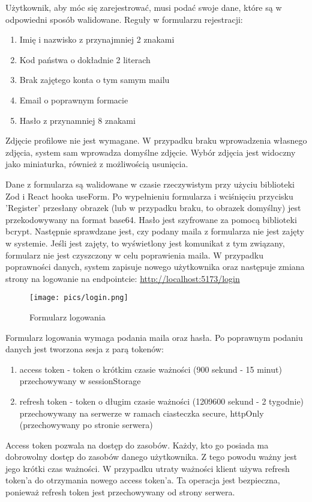 \documentclass{article}
\begin{document}
Użytkownik, aby móc się zarejestrować, musi podać swoje dane, które są w odpowiedni sposób walidowane. Reguły w formularzu rejestracji:
\begin{enumerate}
    \item Imię i nazwisko z przynajmniej 2 znakami
    \item Kod państwa o dokładnie 2 literach
    \item Brak zajętego konta o tym samym mailu
    \item Email o poprawnym formacie
    \item Hasło z przynamniej 8 znakami
\end{enumerate}

Zdjęcie profilowe nie jest wymagane. W przypadku braku wprowadzenia własnego zdjęcia, system sam wprowadza domyślne zdjęcie. Wybór zdjęcia jest widoczny jako miniaturka, również z możliwością usunięcia.

Dane z formularza są walidowane w czasie rzeczywistym przy użyciu biblioteki Zod
i React hooka useForm. Po wypełnieniu formularza i wciśnięciu przycisku 'Register'
przesłany obrazek (lub w przypadku braku, to obrazek domyślny) jest przekodowywany
na format base64. Hasło jest szyfrowane za pomocą biblioteki bcrypt. Następnie
sprawdzane jest, czy podany maila z formularza nie jest zajęty w systemie.
Jeśli jest zajęty, to wyświetlony jest komunikat z tym związany, formularz
nie jest czyszczony w celu poprawienia maila. W przypadku poprawności danych,
system zapisuje nowego użytkownika oraz następuje zmiana strony
na logowanie na endpointcie: \url{http://localhost:5173/login}

\begin{figure}[h]
    \centering
    \texttt{[image: pics/login.png]}
    \caption*{Formularz logowania}
\end{figure}

Formularz logowania wymaga podania maila oraz hasła. Po poprawnym podaniu danych
jest tworzona sesja z parą tokenów:
\begin{enumerate}
  \item access token - token o krótkim czasie ważności (900 sekund - 15 minut)
  przechowywany w sessionStorage
  \item refresh token - token o długim czasie ważności (1209600 sekund - 2 tygodnie)
  przechowywany na serwerze w ramach ciasteczka secure, httpOnly (przechowywany
  po stronie serwera)
\end{enumerate}
Access token pozwala na dostęp do zasobów. Każdy, kto go posiada ma dobrowolny
dostęp do zasobów danego użytkownika. Z tego powodu ważny jest jego krótki czas ważności.
W przypadku utraty ważności klient używa refresh token'a do otrzymania nowego
access token'a. Ta operacja jest bezpieczna, ponieważ refresh token
jest przechowywany od strony serwera.
\end{document}
